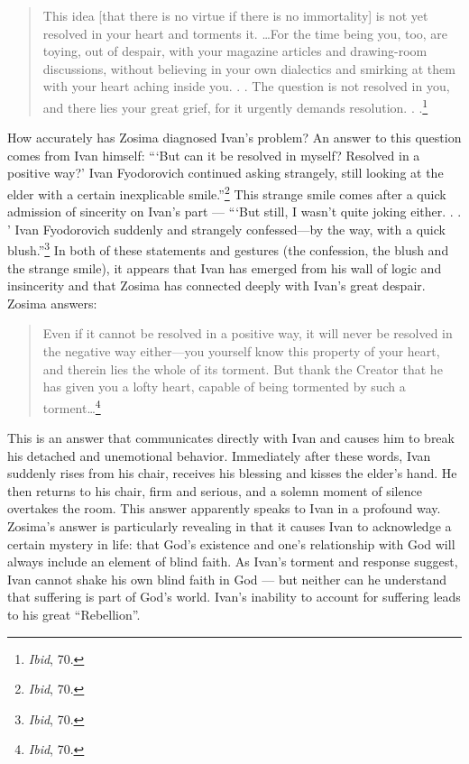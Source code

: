 \begin{quote}
\singlespacing
This idea [that there is no virtue if there is no immortality] is not yet resolved in your heart and torments it. \ldots For the time being you, too, are toying, out of despair, with your magazine articles and drawing-room discussions, without believing in your own dialectics and smirking at them with your heart aching inside you. . . The question is not resolved in you, and there lies your great grief, for it urgently demands resolution. . .\footnote{\emph{Ibid}, 70.}
\end{quote}

How accurately has Zosima diagnosed Ivan's problem? An answer to this question comes from Ivan himself: ```But can it be resolved in myself? Resolved in a positive way?' Ivan Fyodorovich continued asking strangely, still looking at the elder with a certain inexplicable smile.''\footnote{\emph{Ibid}, 70.} This strange smile comes after a quick admission of sincerity on Ivan's part --- ```But still, I wasn't quite joking either. . . ' Ivan Fyodorovich suddenly and strangely confessed---by the way, with a quick blush.''\footnote{\emph{Ibid}, 70.} In both of these statements and gestures (the confession, the blush and the strange smile), it appears that Ivan has emerged from his wall of logic and insincerity and that Zosima has connected deeply with Ivan's great despair. Zosima answers: 

\begin{quote}
\singlespacing
Even if it cannot be resolved in a positive way, it will never be resolved in the negative way either---you yourself know this property of your heart, and therein lies the whole of its torment. But thank the Creator that he has given you a lofty heart, capable of being tormented by such a torment\ldots\footnote{\emph{Ibid}, 70.} 
\end{quote}

This is an answer that communicates directly with Ivan and causes him to break his detached and unemotional behavior. Immediately after these words, Ivan suddenly rises from his chair, receives his blessing and kisses the elder's hand. He then returns to his chair, firm and serious, and a solemn moment of silence overtakes the room. This answer apparently speaks to Ivan in a profound way. Zosima's answer is particularly revealing in that it causes Ivan to acknowledge a certain mystery in life: that God's existence and one's relationship with God will always include an element of blind faith. As Ivan's torment and response suggest, Ivan cannot shake his own blind faith in God --- but neither can he understand that suffering is part of God's world. Ivan's inability to account for suffering leads to his great ``Rebellion''.

